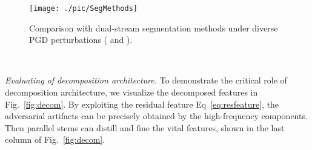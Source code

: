 \documentclass[sigconf]{acmart}
\begin{document}
\begin{figure}[htb]
	\centering
	\texttt{[image: ./pic/SegMethods]}
	
	\caption{{Comparison with  dual-stream segmentation methods under diverse PGD perturbations ( and ).}}
	\label{fig:segdual}
\end{figure}
\begin{table}[htb]
	\centering
	\caption{Evaluating the effectiveness of the image fusion module compared with the dual-stream segmentation methods.}~\label{tab:segnetwork}
	
	\renewcommand{\arraystretch}{1.1}
	\vspace{-0.4cm}
\end{table}

\textit{Evaluating of decomposition architecture.}  To demonstrate the critical role of decomposition architecture, we visualize the decomposed features in Fig.~\ref{fig:decom}. By exploiting the residual feature Eq~\eqref{eq:resfeature}, the adversarial artifacts can be precisely obtained by the high-frequency components. Then parallel stems can distill and fine the vital features, shown in the last column of Fig.~\ref{fig:decom}.
\end{document}
